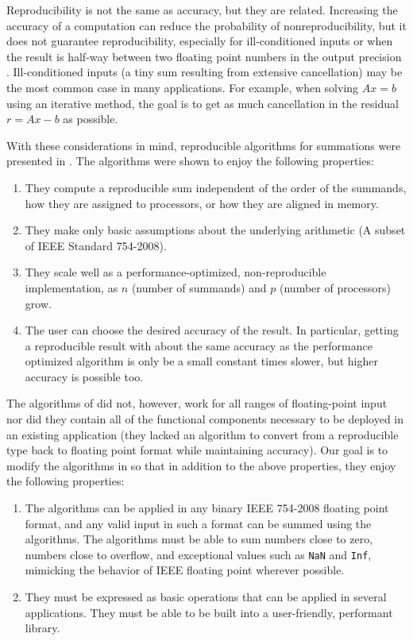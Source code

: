   Reproducibility is not the same as accuracy, but they are related. Increasing the accuracy of a computation can reduce the probability of nonreproducibility, but it does not guarantee reproducibility, especially for ill-conditioned inputs or when the result is half-way between two floating point numbers in the output precision \cite{taufer}. Ill-conditioned inputs (a tiny sum resulting from extensive cancellation) may be the most common case in many applications. For example, when solving $Ax = b$ using an iterative method, the goal is to get as much cancellation in the residual $r = Ax - b$ as possible.

  With these considerations in mind, reproducible algorithms for summations were presented in \cite{repsum}. The algorithms were shown to enjoy the following properties:
  \begin{enumerate}
    \item They compute a reproducible sum independent of the order of the summands, how they are assigned to processors, or how they are aligned in memory.
    \item They make only basic assumptions about the underlying arithmetic (A subset of IEEE Standard 754-2008).
    \item They scale well as a performance-optimized, non-reproducible implementation, as $n$ (number of summands) and $p$ (number of processors) grow.
    \item The user can choose the desired accuracy of the result. In particular, getting a reproducible result with about the same accuracy as the performance optimized algorithm is only be a small constant times slower, but higher accuracy is possible too.
  \end{enumerate}
  The algorithms of \cite{repsum} did not, however, work for all ranges of floating-point input nor did they contain all of the functional components necessary to be deployed in an existing application (they lacked an algorithm to convert from a reproducible type back to floating point format while maintaining accuracy). Our goal is to modify the algorithms in \cite{repsum} so that in addition to the above properties, they enjoy the following properties:
  \begin{enumerate}
    \item The algorithms can be applied in any binary IEEE 754-2008 floating point format, and any valid input in such a format can be summed using the algorithms. The algorithms must be able to sum numbers close to zero, numbers close to overflow, and exceptional values such as \texttt{NaN} and \texttt{Inf}, mimicking the behavior of IEEE floating point wherever possible.
    \item They must be expressed as basic operations that can be applied in several applications. They must be able to be built into a user-friendly, performant library.
  \end{enumerate}

